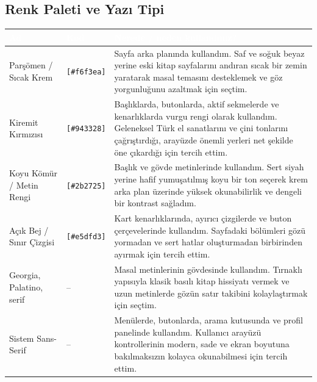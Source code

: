 \documentclass[12pt,a4paper]{article}
\begin{document}
\subsection{Renk Paleti ve Yazı Tipi}
\begin{center}
\begin{tabular}{@{} l l >{\raggedright\arraybackslash}p{8cm} @{}}
\toprule
\rowcolor{ana}\textcolor{white}{\textbf{Ad}} & \textcolor{white}{\textbf{Kod}} & \textcolor{white}{\textbf{Nerede / neden kullandınız?}} \\
\midrule
Parşömen / Sıcak Krem & \texttt{[\#f6f3ea]} & Sayfa arka planında kullandım. Saf ve soğuk beyaz yerine eski kitap sayfalarını andıran sıcak bir zemin yaratarak masal temasını desteklemek ve göz yorgunluğunu azaltmak için seçtim. \\
Kiremit Kırmızısı & \texttt{[\#943328]} & Başlıklarda, butonlarda, aktif sekmelerde ve kenarlıklarda vurgu rengi olarak kullandım. Geleneksel Türk el sanatlarını ve çini tonlarını çağrıştırdığı, arayüzde önemli yerleri net şekilde öne çıkardığı için tercih ettim. \\
Koyu Kömür / Metin Rengi & \texttt{[\#2b2725]} & Başlık ve gövde metinlerinde kullandım. Sert siyah yerine hafif yumuşatılmış koyu bir ton seçerek krem arka plan üzerinde yüksek okunabilirlik ve dengeli bir kontrast sağladım. \\
Açık Bej / Sınır Çizgisi & \texttt{[\#e5dfd3]} & Kart kenarlıklarında, ayırıcı çizgilerde ve buton çerçevelerinde kullandım. Sayfadaki bölümleri gözü yormadan ve sert hatlar oluşturmadan birbirinden ayırmak için tercih ettim. \\
Georgia, Palatino, serif & -- & Masal metinlerinin gövdesinde kullandım. Tırnaklı yapısıyla klasik basılı kitap hissiyatı vermek ve uzun metinlerde gözün satır takibini kolaylaştırmak için seçtim. \\
Sistem Sans-Serif & -- & Menülerde, butonlarda, arama kutusunda ve profil panelinde kullandım. Kullanıcı arayüzü kontrollerinin modern, sade ve ekran boyutuna bakılmaksızın kolayca okunabilmesi için tercih ettim. \\
\bottomrule
\end{tabular}
\end{center}
\end{document}
